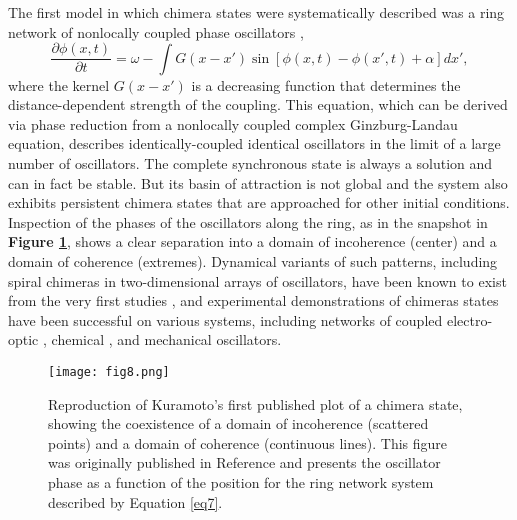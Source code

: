 \documentclass[
preprint,
superscriptaddress,
aps,
prl,
]{revtex4-1}
\begin{document}
The first model in which chimera states were systematically described was a ring network of nonlocally coupled phase oscillators \cite{kuramoto2002coexistence},
\begin{equation}
\frac{\partial \phi(x,t)}{\partial t}= \omega - \int G(x-x') \sin \left[ \phi(x,t) - \phi(x',t) + \alpha \right] dx',
\label{eq7}  
\end{equation}
where the kernel $G(x-x')$ is a decreasing function that determines the distance-dependent strength of the coupling. This equation, which can be derived via phase reduction from a nonlocally coupled complex Ginzburg-Landau equation, describes identically-coupled identical oscillators in the limit of
  {\color{black} a}
 large number of oscillators. The complete synchronous state is always a solution and can in fact be stable. But its basin of attraction is not global and the system also exhibits persistent chimera states that are approached for other initial conditions.  Inspection of the phases of the oscillators along the ring, as in the snapshot in \textbf{Figure \ref{fig8}}, shows a clear separation into a domain of incoherence (center) and a domain of coherence (extremes).  Dynamical variants of such  patterns,
 including spiral chimeras in two-dimensional arrays of oscillators, have been known to exist from the very first studies \cite{kuramoto2003rotating}, and experimental demonstrations of chimeras states have been successful on various systems, including networks of coupled electro-optic \cite{hagerstrom2012experimental}, chemical \cite{tinsley2012chimera}, and mechanical \cite{martens2013chimera} oscillators.
 
 \begin{figure}[t]  
\texttt{[image: fig8.png]}
\caption{
Reproduction of Kuramoto's first published plot of a chimera state, showing the coexistence of a domain of incoherence (scattered points) and a domain of coherence (continuous lines).
This figure was originally published in Reference \cite{kuramoto2003reduction} and 
presents 
the oscillator phase as a function of the position for
 the ring network system described by Equation \ref{eq7}.
}
\label{fig8}
\end{figure}
\end{document}

